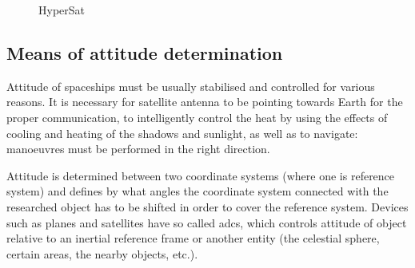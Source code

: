 \documentclass[12pt,a4paper,oneside]{article}
\begin{document}
\begin{figure}[!htbp]
  \centering
  \hfill
  \hfill
  \caption{HyperSat}
  \label{fig:hypersat-examples}
\end{figure}

\subsection{Means of attitude determination}

Attitude of spaceships must be usually stabilised and controlled for various reasons.
It is necessary for satellite antenna to be pointing towards Earth for the proper communication, to intelligently control the heat by using the effects of cooling and heating of the shadows and sunlight, as well as to navigate: manoeuvres must be performed in the right direction.

Attitude is determined between two coordinate systems (where one is reference system) and defines by what angles the coordinate system connected with the researched object has to be shifted in order to cover the reference system.
Devices such as planes and satellites have so called \gls{adcs}, which controls attitude of object relative to an inertial reference frame or another entity (the celestial sphere, certain areas, the nearby objects, etc.).
\end{document}
